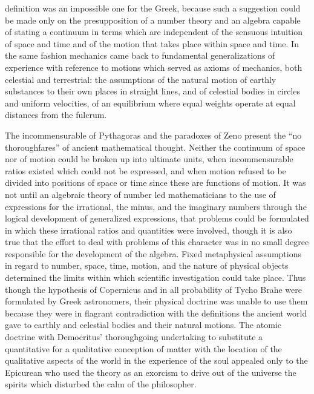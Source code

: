 \documentclass[12pt]{article}
\begin{document}
definition was an impossible one for the Greek, because
such a suggestion could be made only on the
presupposition of a number theory and an algebra
capable of stating a continuum in terms which are
independent of the sensuous intuition of space and time
and of the motion that takes place within space and
time. In the same fashion mechanics came back to
fundamental generalizations of experience with reference
to motions which served as axioms of mechanics,
both celestial and terrestrial: the assumptions of the
natural motion of earthly substances to their own
places in straight lines, and of celestial bodies in circles
and uniform velocities, of an equilibrium where equal
weights operate at equal distances from the fulcrum.


The incommensurable of Pythagoras and the paradoxes
of Zeno present the ``no thoroughfares'' of ancient
mathematical thought. Neither the continuum
of space nor of motion could be broken up into ultimate
units, when incommensurable ratios existed which
could not be expressed, and when motion refused to be
divided into positions of space or time since these are
functions of motion. It was not until an algebraic
theory of number led mathematicians to the use of
expressions for the irrational, the minus, and the imaginary
numbers through the logical development of
generalized expressions, that problems could be formulated
in which these irrational ratios and quantities
were involved, though it is also true that the effort
to deal with problems of this character was in no small
degree responsible for the development of the algebra.
Fixed metaphysical assumptions in regard to number,
space, time, motion, and the nature of physical objects
determined the limits within which scientific investigation
could take place. Thus though the hypothesis
of Copernicus and in all probability of Tycho Brahe
were formulated by Greek astronomers, their physical
doctrine was unable to use them because they were in
flagrant contradiction with the definitions the ancient
world gave to earthly and celestial bodies and their
natural motions. The atomic doctrine with Democritus'
thoroughgoing undertaking to substitute a quantitative
for a qualitative conception of matter with the
location of the qualitative aspects of the world in the
experience of the soul appealed only to the Epicurean
who used the theory as an exorcism to drive out of the
universe the spirits which disturbed the calm of the
philosopher.
\end{document}
